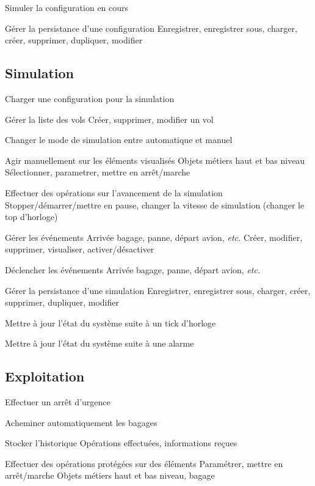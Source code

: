 \nBesoin
{Simuler la configuration en cours}
{}
{}

\nBesoin
{Gérer la persistance d'une configuration}
{}
{Enregistrer, enregistrer sous, charger, créer, supprimer, dupliquer, modifier}

\subsection{Simulation}
\setcounter{cntBesoins}{1}

\nBesoin
{Charger une configuration pour la simulation}
{}
{}

\nBesoin
{Gérer la liste des vols}
{}
{Créer, supprimer, modifier un vol}

\nBesoin
{Changer le mode de simulation entre automatique et manuel}
{}
{}

\nBesoin
{Agir manuellement sur les éléments visualisés}
{Objets métiers haut et bas niveau}
{Sélectionner, parametrer, mettre en arrêt/marche}

\nBesoin
{Effectuer des opérations sur l'avancement de la simulation}
{}
{Stopper/démarrer/mettre en pause, changer la vitesse de simulation (changer le top d'horloge)}

\nBesoin
{Gérer les événements}
{Arrivée bagage, panne, départ avion, \textsl{etc.}}
{Créer, modifier, supprimer, visualiser, activer/désactiver}

\nBesoin
{Déclencher les événements}
{Arrivée bagage, panne, départ avion, \textsl{etc.}}
{}

\nBesoin
{Gérer la persistance d'une simulation}
{}
{Enregistrer, enregistrer sous, charger, créer, supprimer, dupliquer, modifier}

\nBesoin
{Mettre à jour l'état du système suite à un tick d'horloge}
{}
{}

\nBesoin
{Mettre à jour l'état du système suite à une alarme}
{}
{}

\subsection{Exploitation}
\setcounter{cntBesoins}{1}

\nBesoin
{Effectuer un arrêt d'urgence}
{}{}

\nBesoin
{Acheminer automatiquement les bagages}
{}{}

\nBesoin
{Stocker l'historique}
{Opérations effectuées, informations reçues}
{}

\nBesoin
{Effectuer des opérations protégées sur des éléments}
{Paramétrer, mettre en arrêt/marche}
{Objets métiers haut et bas niveau, bagage}


